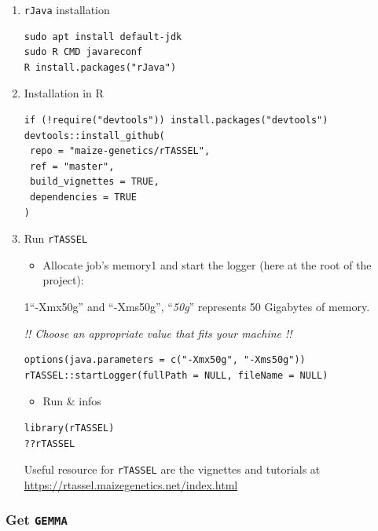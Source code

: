 \begin{enumerate}
  \def\labelenumi{\arabic{enumi}.}
  \item
        \texttt{rJava} installation

        \begin{verbatim}
sudo apt install default-jdk
sudo R CMD javareconf
R install.packages("rJava")
\end{verbatim}
  \item
        Installation in R

        \begin{verbatim}
if (!require("devtools")) install.packages("devtools")
devtools::install_github(
 repo = "maize-genetics/rTASSEL",
 ref = "master",
 build_vignettes = TRUE,
 dependencies = TRUE
)
\end{verbatim}
  \item
        Run \texttt{rTASSEL}

        \begin{itemize}
          \tightlist
          \item
                Allocate job's memory1 and start the logger (here at the root of the
                project):
        \end{itemize}

        1``-Xmx50g'' and ``-Xms50g'', ``\emph{50g}'' represents 50 Gigabytes
        of memory.

        \emph{!! Choose an appropriate value that fits your machine !!}

        \begin{verbatim}
options(java.parameters = c("-Xmx50g", "-Xms50g"))
rTASSEL::startLogger(fullPath = NULL, fileName = NULL)
\end{verbatim}

        \begin{itemize}
          \tightlist
          \item
                Run \& infos
        \end{itemize}

        \begin{verbatim}
library(rTASSEL)
??rTASSEL
\end{verbatim}

        Useful resource for \texttt{rTASSEL} are the vignettes and tutorials
        at \url{https://rtassel.maizegenetics.net/index.html}
\end{enumerate}

\hypertarget{get-gemma}{%
  \subsubsection{\texorpdfstring{Get
      \texttt{GEMMA}}{Get GEMMA}}\label{get-gemma}}

